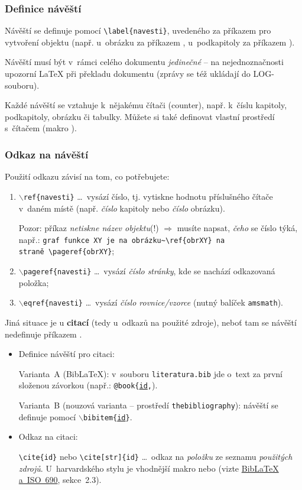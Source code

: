 \subsubsection{Definice návěští}

Návěští se definuje pomocí {\tt \textbackslash label\{navesti\}}, uvedeného {\color{red} za} příkazem pro vytvoření objektu (např. u~obrázku za příkazem , u~podkapitoly za příkazem ).\par 
{\color{red} Návěští musí být v~rámci celého dokumentu {\em jedinečné}} -- na nejednoznačnosti upozorní {\LaTeX} při překladu dokumentu (zprávy se též ukládají do LOG-souboru).
\par 
Každé návěští se vztahuje k~nějakému čítači (coun\-ter), např. k~číslu kapitoly, podkapitoly, obrázku či tabulky. Můžete si také definovat vlastní prostředí
s~čítačem (makro ).

\subsubsection{Odkaz na návěští}
Použití odkazu závisí na tom, co potřebujete:
\begin{enumerate}
\item {\tt $\backslash$ref\{navesti\}} \dots\ vysází číslo, tj. vytiskne hodnotu příslušného čítače v~daném místě (např. {\em číslo} kapitoly nebo {\em číslo} obrázku).\par
Pozor: příkaz \textit{netiskne název objektu}(!) $\Rightarrow$ musíte napsat, \textit{čeho} se číslo týká, např.: {\tt graf funkce XY je na {\color{red}obrázku}\textasciitilde \textbackslash ref\{obrXY\} na straně~\textbackslash pageref\{obrXY\}};
%
\item {\tt$\backslash$pageref\{navesti\}} \dots\ vysází \textit{číslo stránky}, kde se nachází odkazovaná položka;
\item {\tt $\backslash$eqref\{navesti\}} \dots\ vysází \textit{číslo rovnice/vzorce} (nutný balíček {\tt amsmath}).
\end{enumerate}
Jiná situace je u \textbf{citací} (tedy u~odkazů na použité zdroje), neboť tam se návěští nedefinuje příkazem .
\begin{itemize}
\item Definice návěští pro citaci:\par
Varianta~A (BibLaTeX): v~souboru \texttt{literatura.bib} jde o~text za první složenou závorkou (např.: \texttt{@book\{\underline{id},}).\par
Varianta~B (nouzová varianta -- prostředí \texttt{thebibliography}): návěští se definuje pomocí {\tt $\backslash$bibitem\{\underline{id}\}}. 
\item Odkaz na citaci:\par
{\tt \textbackslash cite\{id\}} nebo {\tt \textbackslash cite[str]\{id\}} \dots\ odkaz na \textit{položku} ze seznamu \textit{použitých zdrojů}. U~harvardského stylu je vhodnější makro  nebo  (vizte \href{https://at.ctan.niranjan.co/macros/latex/contrib/biblatex-contrib/biblatex-iso690/biblatex-iso690.pdf}{BibLaTeX a~ISO~690}, sekce~2.3).
\end{itemize}


